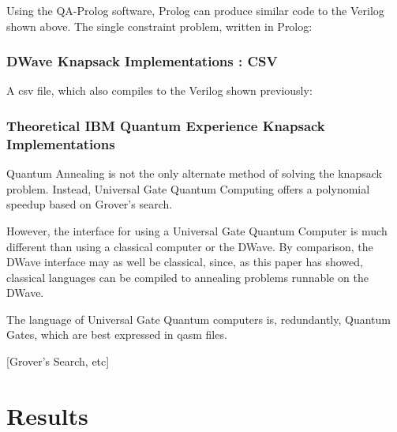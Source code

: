 \documentclass{article}
\begin{document}
Using the QA-Prolog software, Prolog can produce similar code to the Verilog shown above.
The single constraint problem, written in Prolog:
\lstset{language=Prolog}


\subsubsection{DWave Knapsack Implementations : CSV}

A csv file, which also compiles to the Verilog shown previously:

\newpage

\subsubsection{Theoretical IBM Quantum Experience Knapsack Implementations}

Quantum Annealing is not the only alternate method of solving the knapsack problem.
Instead, Universal Gate Quantum Computing offers a polynomial speedup based on Grover's search.

However, the interface for using a Universal Gate Quantum Computer is much different than using a classical computer or the DWave.
By comparison, the DWave interface may as well be classical, since, as this paper has showed, classical languages can be compiled to annealing problems runnable on the DWave.

The language of Universal Gate Quantum computers is, redundantly, Quantum Gates, which are best expressed in qasm files.

[Grover's Search, etc]

\section{Results}
\end{document}
